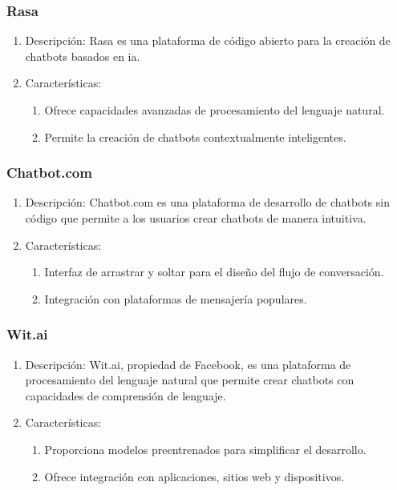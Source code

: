 \subsubsection{Rasa}
\begin{enumerate}
\item Descripción: Rasa es una plataforma de código abierto para la creación de chatbots basados en \acrlong{ia}.
\item Características:
\begin{enumerate}
\item Ofrece capacidades avanzadas de procesamiento del lenguaje natural.
\item Permite la creación de chatbots contextualmente inteligentes.
\end{enumerate}
\end{enumerate}

\subsubsection{Chatbot.com}
\begin{enumerate}
\item Descripción: Chatbot.com es una plataforma de desarrollo de chatbots sin código que permite a los usuarios crear chatbots de manera intuitiva.
\item Características:
\begin{enumerate}
\item Interfaz de arrastrar y soltar para el diseño del flujo de conversación.
\item Integración con plataformas de mensajería populares.
\end{enumerate}
\end{enumerate}

\subsubsection{Wit.ai}
\begin{enumerate}
\item Descripción: Wit.ai, propiedad de Facebook, es una plataforma de procesamiento del lenguaje natural que permite crear chatbots con capacidades de comprensión de lenguaje.
\item Características:
\begin{enumerate}
\item Proporciona modelos preentrenados para simplificar el desarrollo.
\item Ofrece integración con aplicaciones, sitios web y dispositivos.
\end{enumerate}
\end{enumerate}

